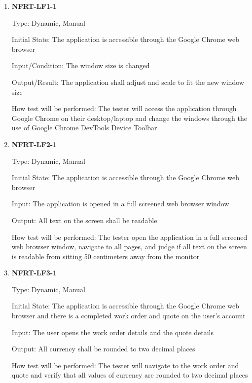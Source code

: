 \documentclass[12pt, titlepage]{article}
\begin{document}
\begin{enumerate}

	\item \textbf{NFRT-LF1-1} %

	      Type: Dynamic, Manual

	      Initial State: The application is accessible through the Google Chrome web browser

	      Input/Condition: The window size is changed

	      Output/Result: The application shall adjust and scale to fit the new window size

	      How test will be performed: The tester will access the application through Google Chrome on their
	      desktop/laptop and change the windows through the use of Google Chrome DevTools Device Toolbar

	\item \textbf{NFRT-LF2-1} %

	      Type: Dynamic, Manual

	      Initial State: The application is accessible through the Google Chrome web browser

	      Input: The application is opened in a full screened web browser window

	      Output: All text on the screen shall be readable

	      How test will be performed: The tester open the application in a full screened web browser window,
	      navigate to all pages, and judge if all text on the screen is readable from sitting 50 centimeters
	      away from the monitor

	\item \textbf{NFRT-LF3-1} %

	      Type: Dynamic, Manual

	      Initial State: The application is accessible through the Google Chrome web browser and there is a
	      completed work order and quote on the user's account

	      Input: The user opens the work order details and the quote details

	      Output: All currency shall be rounded to two decimal places

	      How test will be performed: The tester will navigate to the work order and quote and verify that
	      all values of currency are rounded to two decimal places

\end{enumerate}
\end{document}
